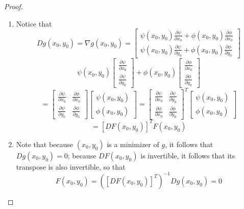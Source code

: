 \documentclass{article}
\begin{document}
\begin{proof}
\qquad
\begin{enumerate}[label=\alph*.]
\item Notice that 
\[ Dg(x_0, y_0) = \nabla g(x_0, y_0) = \begin{bmatrix}
\psi(x_0, y_0)\frac{\partial \psi}{\partial x_0} + \phi(x_0, y_0)\frac{\partial \phi}{\partial x_0} \\ \psi(x_0, y_0)\frac{\partial \psi}{\partial y_0} + \phi(x_0, y_0)\frac{\partial \phi}{\partial y_0}
\end{bmatrix}
\]
\[ \psi(x_0, y_0) \begin{bmatrix} \frac{\partial \psi}{\partial x_0} \\ \frac{\partial \psi}{\partial y_0} \end{bmatrix} + \phi(x_0, y_0) \begin{bmatrix} \frac{\partial \phi}{\partial x_0} \\ \frac{\partial \phi}{\partial y_0} \end{bmatrix}\]
\[ = \begin{bmatrix} \frac{\partial \psi}{\partial x_0} & \frac{\partial \phi}{\partial x_0}\\ \frac{\partial \psi}{\partial y_0} & \frac{\partial \phi}{\partial y_0}\end{bmatrix} \begin{bmatrix} \psi(x_0, y_0) \\ \phi(x_0, y_0) \end{bmatrix} = \begin{bmatrix} \frac{\partial \psi}{\partial x_0} & \frac{\partial \psi}{\partial y_0}\\ \frac{\partial \phi}{\partial x_0} & \frac{\partial \phi}{\partial y_0}\end{bmatrix}^T \begin{bmatrix} \psi(x_0, y_0) \\ \phi(x_0, y_0) \end{bmatrix}\]
\[ = [DF(x_0, y_0)]^TF(x_0, y_0)\]
\item Note that because $(x_0, y_0)$ is a minimizer of $g$, it follows that $Dg(x_0, y_0) = 0$; because $DF(x_0, y_0)$ is invertible, it follows that its transpose is also invertible, so that
\[ F(x_0, y_0) = ([DF(x_0, y_0)]^T)^{-1}Dg(x_0, y_0) = 0\]
\end{enumerate}
\end{proof}
\end{document}
